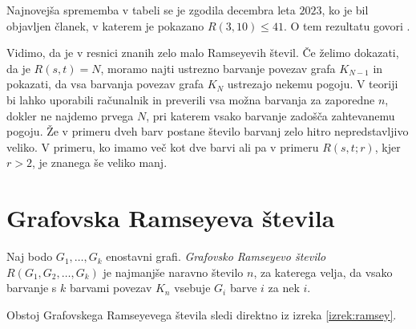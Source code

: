 \documentclass[twoside,11pt]{article}
\begin{document}
Najnovejša sprememba v tabeli se je zgodila decembra leta $2023$, ko je bil objavljen 
članek, v katerem je pokazano $R(3, 10) \le 41$. 
O tem rezultatu govori \cite{r41}.

Vidimo, da je v resnici znanih zelo malo Ramseyevih števil. Če želimo dokazati, 
da je $R(s, t) = N$, moramo najti ustrezno barvanje povezav grafa $K_{N-1}$ in pokazati, da 
vsa barvanja povezav grafa $K_{N}$ ustrezajo nekemu pogoju. V teoriji bi lahko uporabili računalnik 
in preverili vsa možna barvanja za zaporedne $n$, dokler ne najdemo prvega $N$, pri katerem vsako 
barvanje zadošča zahtevanemu pogoju. Že v primeru dveh barv postane število barvanj zelo hitro 
nepredstavljivo veliko. V primeru, ko imamo več kot dve barvi ali pa v primeru $R(s, t; r)$, kjer $r > 2$, je znanega še
veliko manj.

\section{Grafovska Ramseyeva števila}

\begin{definicija}
    Naj bodo $G_1, \dots, G_k$ enostavni grafi. \emph{Grafovsko Ramseyevo število}
    $R(G_1, G_2, \dots, G_k)$ je najmanjše naravno število $n$, za katerega velja, da 
    vsako barvanje s $k$ barvami povezav $K_n$ vsebuje $G_i$ barve $i$ za nek $i$. 
\end{definicija}

Obstoj Grafovskega Ramseyevega števila sledi direktno iz izreka \ref{izrek:ramsey}.
\end{document}
